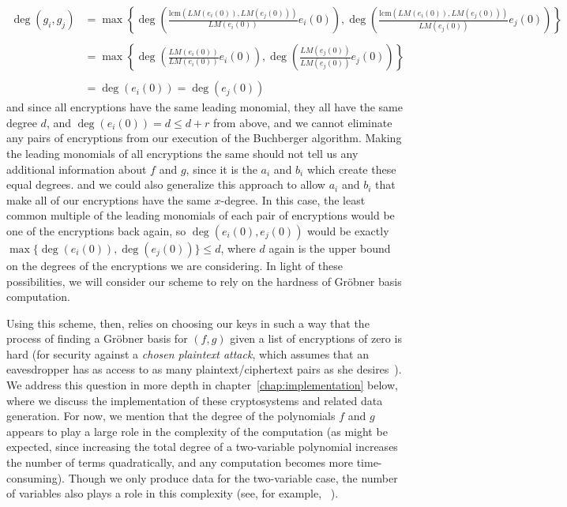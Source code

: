 \documentclass[11pt]{report}
\begin{document}
\begin{align*}
\deg(g_i,g_j) &= \max\left\{\deg\left(\frac{\text{lcm}(LM(e_i(0)),LM(e_j(0)))}{LM(e_i(0))}e_i(0)\right),
\deg\left(\frac{\text{lcm}(LM(e_i(0)),LM(e_j(0)))}{LM(e_j(0))}e_j(0)\right)\right\} \\
\\
&= \max\left\{\deg\left(\frac{LM(e_i(0))}{LM(e_i(0))}e_i(0)\right),
\deg\left(\frac{LM(e_j(0))}{LM(e_j(0))}e_j(0)\right)\right\} \\ \\
&= \deg(e_i(0)) = \deg(e_j(0))
\end{align*}
and since all encryptions have the same leading monomial, they all have the same degree $d$, and $\deg(e_i(0)) = d \leq d+r$ from above, and we cannot eliminate any pairs of encryptions from our execution of the Buchberger algorithm. Making the leading monomials of all encryptions the same should not tell us any additional information about $f$ and $g$, since it is the $a_i$ and $b_i$ which create these equal degrees. and we could also generalize this approach to allow $a_i$ and $b_i$ that make all of our encryptions have the same $x$-degree. In this case, the least common multiple of the leading monomials of each pair of encryptions would be one of the encryptions back again, so $\deg(e_i(0),e_j(0))$ would be exactly $\max\{\deg(e_i(0)),\deg(e_j(0))\} \leq d$, where $d$ again is the upper bound on the degrees of the encryptions we are considering. In light of these possibilities, we will consider our scheme to rely on the hardness of Gr\"obner basis computation.


Using this scheme, then, relies on choosing our keys in such a way that the process of finding a Gr\"obner basis for $(f,g)$ given a list of encryptions of zero is hard (for security against a \emph{chosen plaintext attack}, which assumes that an eavesdropper has as access to as many plaintext/ciphertext pairs as she desires~\cite{hoff-piph-silv}). We address this question in more depth in chapter~\ref{chap:implementation} below, where we discuss the implementation of these cryptosystems and related data generation. For now, we mention that the degree of the polynomials $f$ and $g$ appears to play a large role in the complexity of the computation (as might be expected, since increasing the total degree of a two-variable polynomial increases the number of terms quadratically, and any computation becomes more time-consuming). Though we only produce data for the two-variable case, the number of variables also plays a role in this complexity (see, for example, ~\cite{bayer-stillman}).
\end{document}
